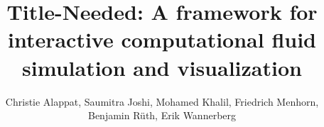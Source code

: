 \documentclass[11pt,a4paper]{article}
\begin{document}

\title{Title-Needed: A framework for interactive computational fluid simulation and
visualization}
\author{Christie Alappat, Saumitra Joshi, Mohamed Khalil, Friedrich Menhorn,\\ Benjamin Rüth, Erik Wannerberg}

\maketitle

\tableofcontents

\listoftodos





















\clearpage
\newpage


\end{document}
